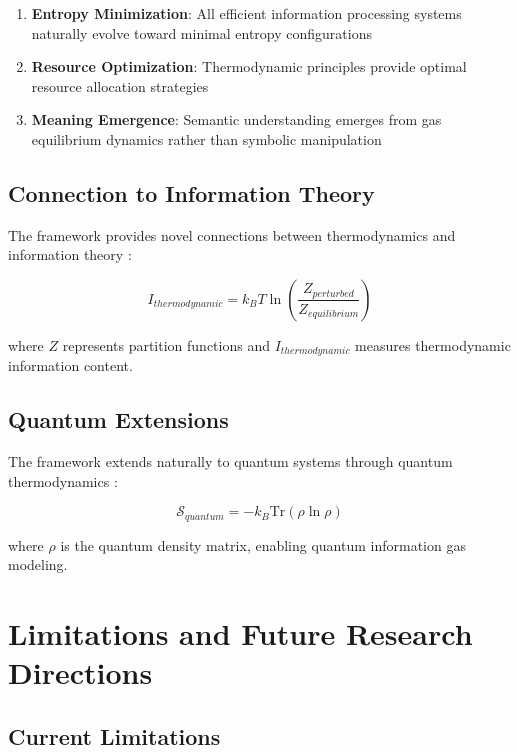 \documentclass[11pt,a4paper]{article}
\begin{document}
\begin{enumerate}
\item \textbf{Entropy Minimization}: All efficient information processing systems naturally evolve toward minimal entropy configurations
\item \textbf{Resource Optimization}: Thermodynamic principles provide optimal resource allocation strategies
\item \textbf{Meaning Emergence}: Semantic understanding emerges from gas equilibrium dynamics rather than symbolic manipulation
\end{enumerate}

\subsection{Connection to Information Theory}

The framework provides novel connections between thermodynamics and information theory \citep{shannon1948mathematical, cover2006elements}:

\begin{equation}
I_{thermodynamic} = k_B T \ln\left(\frac{Z_{perturbed}}{Z_{equilibrium}}\right)
\end{equation}

where $Z$ represents partition functions and $I_{thermodynamic}$ measures thermodynamic information content.

\subsection{Quantum Extensions}

The framework extends naturally to quantum systems through quantum thermodynamics \citep{gemmer2009quantum, goold2016role}:

\begin{equation}
\mathcal{S}_{quantum} = -k_B \text{Tr}(\rho \ln \rho)
\end{equation}

where $\rho$ is the quantum density matrix, enabling quantum information gas modeling.

\section{Limitations and Future Research Directions}

\subsection{Current Limitations}
\end{document}
